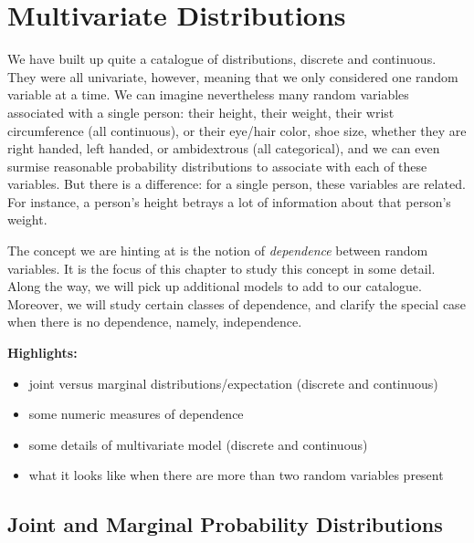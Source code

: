 \chapter{Multivariate Distributions}
\label{sec-7}

\noindent
We have built up quite a catalogue of distributions, discrete and
continuous. They were all univariate, however, meaning that we only
considered one random variable at a time. We can imagine nevertheless
many random variables associated with a single person: their height,
their weight, their wrist circumference (all continuous), or their
eye/hair color, shoe size, whether they are right handed, left handed,
or ambidextrous (all categorical), and we can even surmise reasonable
probability distributions to associate with each of these variables.
But there is a difference: for a single person, these variables are
related. For instance, a person's height betrays a lot of information
about that person's weight.

The concept we are hinting at is the notion of \emph{dependence} between
random variables. It is the focus of this chapter to study this
concept in some detail. Along the way, we will pick up additional
models to add to our catalogue. Moreover, we will study certain
classes of dependence, and clarify the special case when there is no
dependence, namely, independence.

\textbf{Highlights:}
\begin{itemize}
\item joint versus marginal distributions/expectation (discrete and
continuous)
\item some numeric measures of dependence
\item some details of multivariate model (discrete and
continuous)
\item what it looks like when there are more than two random variables
present
\end{itemize}

\section{Joint and Marginal Probability Distributions}
\label{sec-7-1}

